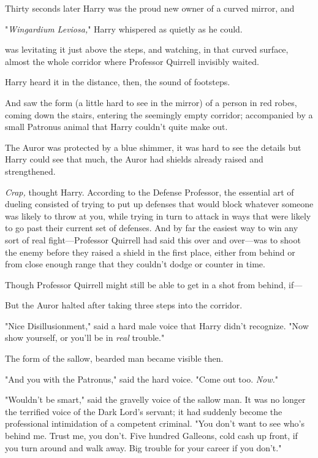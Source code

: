 Thirty seconds later Harry was the proud new owner of a curved mirror,
and{\el}

"\emph{Wingardium Leviosa,}" Harry whispered as quietly as he could.

{\el} was levitating it just above the steps, and watching, in that curved
surface, almost the whole corridor where Professor Quirrell invisibly waited.

Harry heard it in the distance, then, the sound of footsteps.

And saw the form (a little hard to see in the mirror) of a person in red robes,
coming down the stairs, entering the seemingly empty corridor; accompanied by a
small Patronus animal that Harry couldn't quite make out.

The Auror was protected by a blue shimmer, it was hard to see the details but
Harry could see that much, the Auror had shields already raised and
strengthened.

\emph{Crap,} thought Harry. According to the Defense Professor, the essential
art of dueling consisted of trying to put up defenses that would block whatever
someone was likely to throw at you, while trying in turn to attack in ways that
were likely to go past their current set of defenses. And by far the easiest
way to win any sort of real fight—Professor Quirrell had said this over and
over—was to shoot the enemy before they raised a shield in the first place,
either from behind or from close enough range that they couldn't dodge or
counter in time.

Though Professor Quirrell might still be able to get in a shot from behind,
if—

But the Auror halted after taking three steps into the corridor.

"Nice Disillusionment," said a hard male voice that Harry didn't recognize.
"Now show yourself, or you'll be in \emph{real} trouble."

The form of the sallow, bearded man became visible then.

"And you with the Patronus," said the hard voice. "Come out too. \emph{Now.}"

"Wouldn't be smart," said the gravelly voice of the sallow man. It was no
longer the terrified voice of the Dark Lord's servant; it had suddenly become
the professional intimidation of a competent criminal. "You don't want to see
who's behind me. Trust me, you don't. Five hundred Galleons, cold cash up
front, if you turn around and walk away. Big trouble for your career if you
don't."

